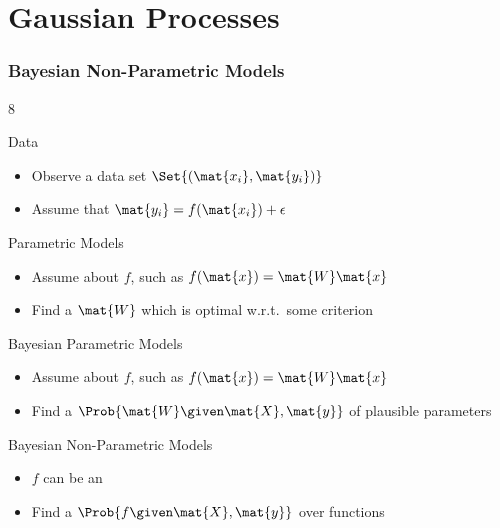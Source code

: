 \section{Gaussian Processes}
\begin{frame}[label=gp_non_parametric_models]
    \frametitle{Bayesian Non-Parametric Models}

    \begin{overlayarea}{\textwidth}{8\baselineskip}
         {
            \begin{block}{Data}
                \begin{itemize}
                    \item Observe a  data set $\Set{\left( \mat{x_i}, \mat{y_i} \right)}$
                    \item Assume that $\mat{y_i} = f(\mat{x_i}) + \epsilon$
                \end{itemize}
            \end{block}
        }
         {
            \begin{block}{Parametric Models}
                \begin{itemize}
                    \item Assume  about $f$, such as $f(\mat{x}) = \mat{W}\mat{x}$
                    \item Find a  $\mat{W}$ which is optimal w.r.t.\ some criterion
                \end{itemize}
            \end{block}
        }
         {
            \begin{block}{Bayesian Parametric Models}
                \begin{itemize}
                    \item Assume  about $f$, such as $f(\mat{x}) = \mat{W}\mat{x}$
                    \item Find a  $\Prob{\mat{W} \given \mat{X}, \mat{y}}$ of plausible parameters
                \end{itemize}
            \end{block}
        }
         {
            \begin{block}{Bayesian Non-Parametric Models}
                \begin{itemize}
                    \item $f$ can be an 
                    \item Find a  $\Prob{f \given \mat{X}, \mat{y}}$ over functions
                \end{itemize}
            \end{block}
        }
    \end{overlayarea}
    \vfill
    \centering
\end{frame}

